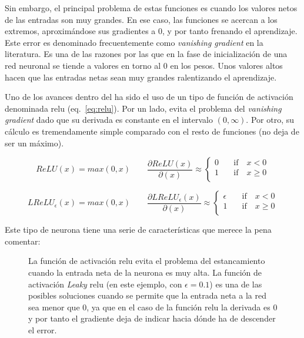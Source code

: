 Sin embargo, el principal problema de estas funciones es cuando los valores netos de las entradas son muy grandes. En ese caso, las funciones se acercan a los extremos, aproximándose sus gradientes a $0$, y por tanto frenando el aprendizaje. Este error es denominado frecuentemente como \textit{vanishing gradient} en la literatura. Es una de las razones por las que en la fase de inicialización de una red neuronal se tiende a valores en torno al $0$ en los pesos. Unos valores altos hacen que las entradas netas sean muy grandes ralentizando el aprendizaje.

Uno de los avances dentro del  ha sido el uso de un tipo de función de activación denominada \Acrfull{relu} (eq.~\ref{eq:relu}). Por un lado, evita el problema del \textit{vanishing gradient} dado que su derivada es constante en el intervalo $(0, \infty)$. Por otro, su cálculo es tremendamente simple comparado con el resto de funciones (no deja de ser un máximo).

\begin{equation}
	ReLU(x) = max(0, x) \qquad
	\frac{\partial ReLU(x)}{\partial(x)} \approx
	\begin{cases}
	0 &\quad\text{if}\quad x < 0 \\
	1 &\quad\text{if}\quad x \geq 0 \\
	\end{cases}
	\label{eq:relu}
\end{equation}

\begin{equation}
	LReLU_\epsilon(x) = max(0, x) \qquad
	\frac{\partial LReLU_\epsilon(x)}{\partial(x)} \approx
	\begin{cases}
	\epsilon &\quad\text{if}\quad x < 0 \\
	1 &\quad\text{if}\quad x \geq 0 \\
	\end{cases}
	\label{eq:leaky-relu}
\end{equation}

Este tipo de neurona tiene una serie de características que merece la pena comentar:

\begin{figure}[!b]
	\centering
	\qquad
	\caption[Funciones de activación: \acrshort{relu} y Leaky-\acrshort{relu}]{La función de activación \gls{relu} evita el problema del estancamiento cuando la entrada neta de la neurona es muy alta. La función de activación \textit{Leaky} \gls{relu} (en este ejemplo, con $\epsilon = 0.1$) es una de las posibles soluciones cuando se permite que la entrada neta a la red sea menor que $0$, ya que en el caso de la función \gls{relu} la derivada es $0$ y por tanto el gradiente deja de indicar hacia dónde ha de descender el error.}
	\label{fig:relu-and-leaky-relu}
\end{figure}

